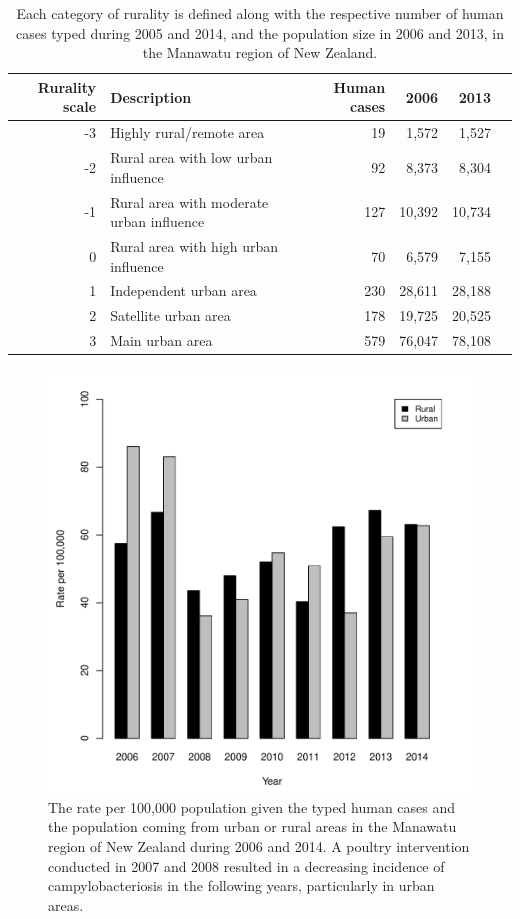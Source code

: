 \documentclass[times, doublespace]{simauth}%
\begin{document}
\begin{table}
  \centering
      \begin{tabular}{rlrrrr}
        \toprule
        Rurality scale & Description & Human cases & 2006 & 2013 \\ \midrule
        -3 & Highly rural/remote area & 19 & 1,572 & 1,527\\
        -2 & Rural area with low urban influence & 92 & 8,373 & 8,304\\
        -1 & Rural area with moderate urban influence & 127 & 10,392 & 10,734\\
        0 & Rural area with high urban influence & 70 & 6,579 & 7,155\\
        1 & Independent urban area & 230 & 28,611 & 28,188\\
        2 & Satellite urban area & 178 & 19,725 & 20,525\\
        3 & Main urban area & 579 & 76,047 & 78,108\\
        \bottomrule
      \end{tabular}
      \caption{Each category of rurality is defined along with the respective number of human cases typed during 2005 and 2014, and the population size in 2006 and 2013, in the Manawatu region of New Zealand.}
      \label{tab2}     
\end{table}


\begin{figure}
  \centering
  \includegraphics[width=.5\linewidth]{Figures/Databar}
  \caption{The rate per 100,000 population given the typed human cases and the population coming from urban or rural areas in the Manawatu region of New Zealand during 2006 and 2014. A poultry intervention conducted in 2007 and 2008 resulted in a decreasing incidence of campylobacteriosis in the following years, particularly in urban areas.}
  \label{fig1}
\end{figure}
\end{document}
